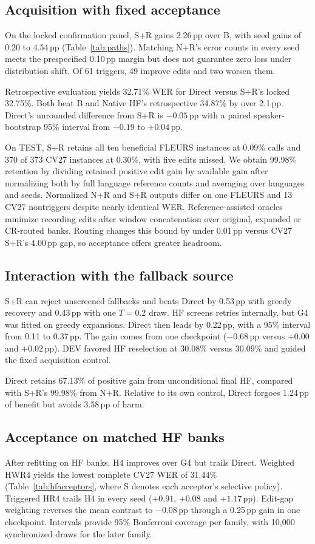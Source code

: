 \subsection{Acquisition with fixed acceptance}
On the locked confirmation panel, S+R gains 2.26\,pp over B, with seed gains of 0.20 to 4.54\,pp (Table~\ref{tab:paths}). Matching N+R's error counts in every seed meets the prespecified 0.10\,pp margin but does not guarantee zero loss under distribution shift. Of 61 triggers, 49 improve edits and two worsen them.

Retrospective evaluation yields 32.71\% WER for Direct versus S+R's locked 32.75\%. Both beat B and Native HF's retrospective 34.87\% by over 2.1\,pp. Direct's unrounded difference from S+R is $-0.05$\,pp with a paired speaker-bootstrap 95\% interval from $-0.19$ to $+0.04$\,pp.

On TEST, S+R retains all ten beneficial FLEURS instances at 0.09\% calls and 370 of 373 CV27 instances at 0.30\%, with five edits missed. We obtain 99.98\% retention by dividing retained positive edit gain by available gain after normalizing both by full language reference counts and averaging over languages and seeds. Normalized N+R and S+R outputs differ on one FLEURS and 13 CV27 nontriggers despite nearly identical WER. Reference-assisted oracles minimize recording edits after window concatenation over original, expanded or CR-routed banks. Routing changes this bound by under 0.01\,pp versus CV27 S+R's 4.00\,pp gap, so acceptance offers greater headroom.

\subsection{Interaction with the fallback source}
S+R can reject unscreened fallbacks and beats Direct by 0.53\,pp with greedy recovery and 0.43\,pp with one $T=0.2$ draw. HF screens retries internally, but G4 was fitted on greedy expansions. Direct then leads by 0.22\,pp, with a 95\% interval from 0.11 to 0.37\,pp. The gain comes from one checkpoint ($-0.68$\,pp versus $+0.00$ and $+0.02$\,pp). DEV favored HF reselection at 30.08\% versus 30.09\% and guided the fixed acquisition control.

Direct retains 67.13\% of positive gain from unconditional final HF, compared with S+R's 99.98\% from N+R. Relative to its own control, Direct forgoes 1.24\,pp of benefit but avoids 3.58\,pp of harm.


\subsection{Acceptance on matched HF banks}
After refitting on HF banks, H4 improves over G4 but trails Direct. Weighted HWR4 yields the lowest complete CV27 WER of 31.44\% (Table~\ref{tab:hfacceptors}, where S denotes each acceptor's selective policy). Triggered HR4 trails H4 in every seed ($+0.91$, $+0.08$ and $+1.17$\,pp). Edit-gap weighting reverses the mean contrast to $-0.08$\,pp through a 0.25\,pp gain in one checkpoint. Intervals provide 95\% Bonferroni coverage per family, with 10,000 synchronized draws for the later family.

